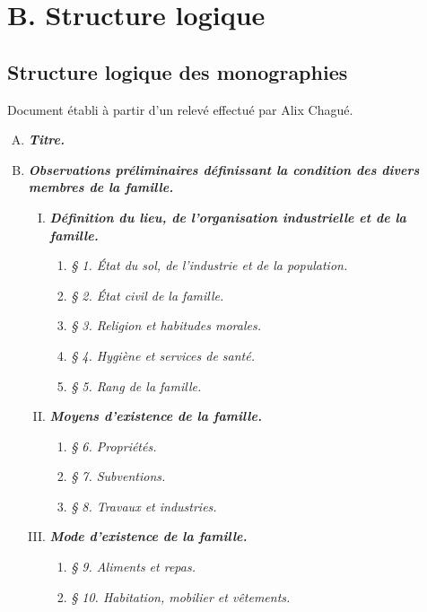 \renewcommand{\thesection}{B.1}
\chapter{B. Structure logique}

\section{Structure logique des monographies}
\label{structure}

Document établi à partir d'un relevé effectué par Alix Chagué.

\begin{enumerate}[A.]
    \item \textbf{\textit{Titre.}}
    \item \textbf{\textit{Observations préliminaires définissant la condition des divers membres de la famille.}}
    \begin{enumerate}[I.]
        \item \textbf{\textit{Définition du lieu, de l'organisation industrielle et de la famille.}}
        \begin{enumerate}[]
            \item \textit{§ 1. État du sol, de l'industrie et de la population.}
            \item \textit{§ 2. État civil de la famille.}
            \item \textit{§ 3. Religion et habitudes morales.}
            \item \textit{§ 4. Hygiène et services de santé.}
            \item \textit{§ 5. Rang de la famille.}
        \end{enumerate}
        \item \textbf{\textit{Moyens d'existence de la famille.}}
        \begin{enumerate}[]
            \item \textit{§ 6. Propriétés.}
            \item \textit{§ 7. Subventions.}
            \item \textit{§ 8. Travaux et industries.}
        \end{enumerate}
        \item \textbf{\textit{Mode d'existence de la famille.}}
        \begin{enumerate}[]
            \item \textit{§ 9. Aliments et repas.}
            \item \textit{§ 10. Habitation, mobilier et vêtements.}

\end{enumerate}
\end{enumerate}
\end{enumerate}
